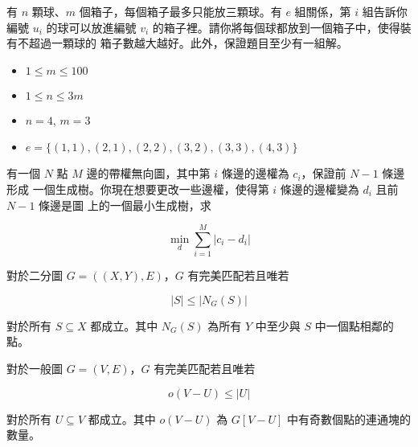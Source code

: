 \documentclass[standalone]{beamer}
\begin{document}
\begin{frame}{}
   {
    \begin{problem}[挑戰 NPC]
      有 $n$ 顆球、$m$ 個箱子，每個箱子最多只能放三顆球。有 $e$ 組關係，第 $i$ 組告訴你編號
      $u_i$ 的球可以放進編號 $v_i$ 的箱子裡。請你將每個球都放到一個箱子中，使得裝有不超過一顆球的
      箱子數越大越好。此外，保證題目至少有一組解。

      \begin{itemize}
        \item $1 \leq m \leq 100$
        \item $1 \leq n \leq 3m$
      \end{itemize}
    \end{problem}
  }
   {
    \begin{itemize}
      \item $n = 4$, $m = 3$
      \item $e = \{(1, 1), (2, 1), (2, 2), (3, 2), (3, 3), (4, 3)\}$
    \end{itemize}
  }
\end{frame}

\begin{frame}{}
   {
    \begin{problem}[Roads]
      有一個 $N$ 點 $M$ 邊的帶權無向圖，其中第 $i$ 條邊的邊權為 $c_i$，保證前 $N - 1$ 條邊形成
      一個生成樹。你現在想要更改一些邊權，使得第 $i$ 條邊的邊權變為 $d_i$ 且前 $N - 1$ 條邊是圖
      上的一個最小生成樹，求

      \[ \min_{d}\sum_{i = 1}^{M}|c_i - d_i| \]
    \end{problem}
  }
\end{frame}

\begin{frame}{}
   {
    \begin{theorem}
      對於二分圖 $G = ((X, Y), E)$，$G$ 有完美匹配若且唯若

      \[ |S| \leq |N_G(S)| \]

      對於所有 $S \subseteq X$ 都成立。其中 $N_G(S)$ 為所有 $Y$ 中至少與 $S$ 中一個點相鄰的點。
    \end{theorem}
  }
   {
    \begin{theorem}
      對於一般圖 $G = (V, E)$，$G$ 有完美匹配若且唯若

      \[ o(V - U) \leq |U| \]

      對於所有 $U \subseteq V$ 都成立。其中 $o(V - U)$ 為 $G[V - U]$ 中有奇數個點的連通塊的數量。
    \end{theorem}
  }
\end{frame}
\end{document}

